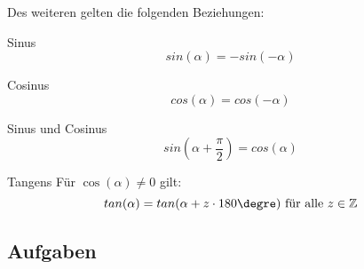 Des weiteren gelten die folgenden Beziehungen:
\begin{gesetz}{Sinus}{}
  $$sin(\alpha) = - sin(-\alpha)$$
  \end{gesetz}
\begin{gesetz}{Cosinus}{}
  $$cos(\alpha) = cos(-\alpha)$$
  \end{gesetz}
\begin{gesetz}{Sinus und Cosinus}{}
  $$sin\left(\alpha+\frac{\pi}{2}\right) = cos(\alpha)$$
  \end{gesetz}
\begin{gesetz}{Tangens}{}
  Für $\cos(\alpha)\ne 0$ gilt:
  $$tan(\alpha) = tan(\alpha + z\cdot{}180\degre) \textrm{ für alle } z\in\mathbb{Z}$$
  \end{gesetz}
\newpage



\subsection*{Aufgaben}

